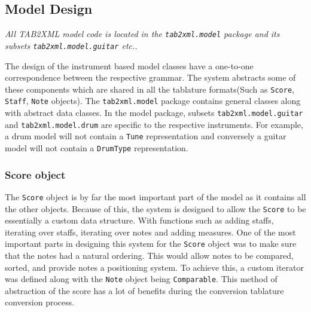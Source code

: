 \documentclass[11pt]{article}
\begin{document}
\subsection{Model Design}
\label{sec:org567c544}
\emph{All TAB2XML model code is located in the \texttt{tab2xml.model} package and its subsets \texttt{tab2xml.model.guitar} etc..}

The design of the instrument based model classes have a one-to-one correspondence between the respective grammar. The system abstracts some of these components which are shared in all the tablature formats(Such as \texttt{Score}, \texttt{Staff}, \texttt{Note} objects). The \texttt{tab2xml.model} package contains general classes along with abstract data classes. In the model package, subsets \texttt{tab2xml.model.guitar} and \texttt{tab2xml.model.drum} are specific to the respective instruments. For example, a drum model will not contain a \texttt{Tune} representation and conversely a guitar model will not contain a \texttt{DrumType} representation.

\subsubsection{Score object}
\label{sec:org2a6ae8d}
The \texttt{Score} object is by far the most important part of the model as it contains all the other objects. Because of this, the system is designed to allow the \texttt{Score} to be essentially a custom data structure. With functions such as adding staffs, iterating over staffs, iterating over notes and
adding measures. One of the most important parts in designing this system for the \texttt{Score} object was to make sure that the notes had a natural ordering. This would allow notes to be compared, sorted, and provide notes a positioning system. To achieve this, a custom iterator was defined along with the \texttt{Note} object being \texttt{Comparable}. This method of abstraction of the score has a lot of benefits during the conversion tablature conversion process.

\newpage
\end{document}
